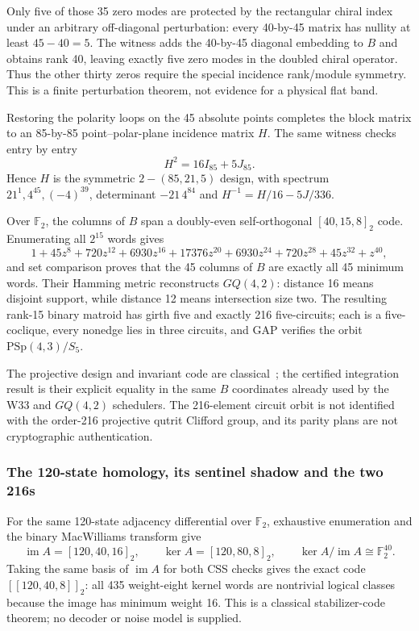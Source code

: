 \documentclass[11pt,letterpaper]{article}
\newcommand{\tagbox}[3]{\tikz[baseline=(X.base)]{\node[inner xsep=3.5pt,inner ysep=1.4pt,rounded corners=1.6pt,fill=#1,text=#2,font=\bfseries\sffamily\tiny] (X) {#3};}}
\newcommand{\PROVED}{\tagbox{greenlite}{green!45!black}{PROVED}}
\begin{document}
Only five of those 35 zero modes are protected by the rectangular chiral index
under an arbitrary off-diagonal perturbation: every 40-by-45 matrix has nullity
at least $45-40=5$. The witness adds the 40-by-45 diagonal embedding to $B$ and
obtains rank 40, leaving exactly five zero modes in the doubled chiral operator.
Thus the other thirty zeros require the special incidence rank/module symmetry.
This is a finite perturbation theorem, not evidence for a physical flat band.
\PROVED

Restoring the polarity loops on the 45 absolute points completes the block
matrix to an 85-by-85 point--polar-plane incidence matrix $H$. The same witness
checks entry by entry
\[
 H^2=16I_{85}+5J_{85}.
\]
Hence $H$ is the symmetric $2-(85,21,5)$ design, with spectrum
$21^1,4^{45},(-4)^{39}$, determinant $-21\,4^{84}$ and
$H^{-1}=H/16-5J/336$. \PROVED

Over $\mathbb F_2$, the columns of $B$ span a doubly-even self-orthogonal
\([40,15,8]_2\) code. Enumerating all $2^{15}$ words gives
\[
 1+45z^8+720z^{12}+6930z^{16}+17376z^{20}
 +6930z^{24}+720z^{28}+45z^{32}+z^{40},
\]
and set comparison proves that the 45 columns of $B$ are exactly all 45
minimum words. Their Hamming metric reconstructs $GQ(4,2)$: distance 16 means
disjoint support, while distance 12 means intersection size two. The resulting
rank-15 binary matroid has girth five and exactly 216 five-circuits; each is a
five-coclique, every nonedge lies in three circuits, and GAP verifies the orbit
$\mathrm{PSp}(4,3)/S_5$. \PROVED

The projective design and invariant code are classical~\cite{rodrigues2008};
the certified integration result is their explicit equality in the same $B$
coordinates already used by the W33 and $GQ(4,2)$ schedulers. The 216-element
circuit orbit is not identified with the order-216 projective qutrit Clifford
group, and its parity plans are not cryptographic authentication.

\subsubsection{The 120-state homology, its sentinel shadow and the two 216s}

For the same 120-state adjacency differential over $\mathbb F_2$, exhaustive
enumeration and the binary MacWilliams transform give
\[
 \operatorname{im}A=[120,40,16]_2,\qquad
 \ker A=[120,80,8]_2,\qquad
 \ker A/\operatorname{im}A\cong \mathbb F_2^{40}.
\]
Taking the same basis of $\operatorname{im}A$ for both CSS checks gives the
exact code $[[120,40,8]]_2$: all 435 weight-eight kernel words are nontrivial
logical classes because the image has minimum weight 16. This is a classical
stabilizer-code theorem; no decoder or noise model is supplied. \PROVED
\end{document}
